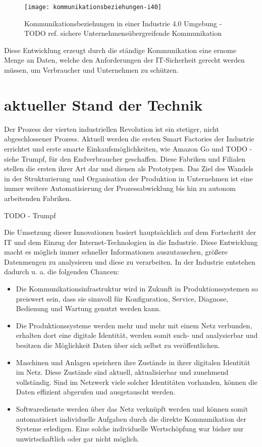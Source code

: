\begin{figure}[h]
  \centering
  \texttt{[image: kommunikationsbeziehungen-i40]}
  \caption{Kommunikationsbeziehungen in einer Industrie 4.0 Umgebung - TODO ref. sichere Unternehmensübergreifende Kommunikation}
  \label{Kap2:Industrie4.0-Kommunikation}
\end{figure}

\clearpage

Diese Entwicklung erzeugt durch die ständige Kommunikation eine ernome Menge an Daten, welche den Anforderungen der IT-Sicherheit gerecht werden müssen, um Verbraucher und Unternehmen zu schützen.

\section{aktueller Stand der Technik}
Der Prozess der vierten industriellen Revolution ist ein stetiger, nicht abgeschlossener Prozess. Aktuell werden die ersten Smart Factories der Industrie errichtet und erste smarte Einkaufsmöglichkeiten, wie Amazon Go und TODO - siehe Trumpf, für den Endverbraucher geschaffen. Diese Fabriken und Filialen stellen die ersten ihrer Art dar und dienen als Prototypen. Das Ziel des Wandels in der Strukturierung und Organisation der Produktion in Unternehmen ist eine immer weitere Automatisierung der Prozessabwicklung bis hin zu autonom arbeitenden Fabriken.

TODO - Trumpf

Die Umsetzung dieser Innovationen basiert hauptsächlich auf dem Fortschritt der \ac{IT} und dem Einzug der Internet-Technologien in die Industrie. Diese Entwicklung macht es möglich immer schneller Informationen auszutauschen, größere Datenmengen zu analysieren und diese zu verarbeiten. In der Industrie entstehen dadurch u. a. die folgenden Chancen:

\begin{itemize}
  \item Die Kommunikationsinfrastruktur wird in Zukunft in Produktionssystemen so preiswert sein, dass sie sinnvoll für Konfiguration, Service, Diagnose, Bedienung und Wartung genutzt werden kann.
  \item Die Produktionssysteme werden mehr und mehr mit einem Netz verbunden, erhalten dort eine digitale Identität, werden somit such- und analysierbar und besitzen die Möglichkeit Daten über sich selbst zu veröffentlichen. 
  \item Maschinen und Anlagen speichern ihre Zustände in ihrer digitalen Identität im Netz. Diese Zustände sind aktuell, aktualisierbar und zunehmend vollständig. Sind im Netzwerk viele solcher Identitäten vorhanden, können die Daten effizient abgerufen und ausgetauscht werden.
  \item Softwaredienste werden über das Netz verknüpft werden und können somit automatisiert individuelle Aufgaben durch die direkte Kommunikation der Systeme erledigen. Eine solche individuelle Wertschöpfung war bisher nur unwirtschaftlich oder gar nicht möglich.
\end{itemize}

